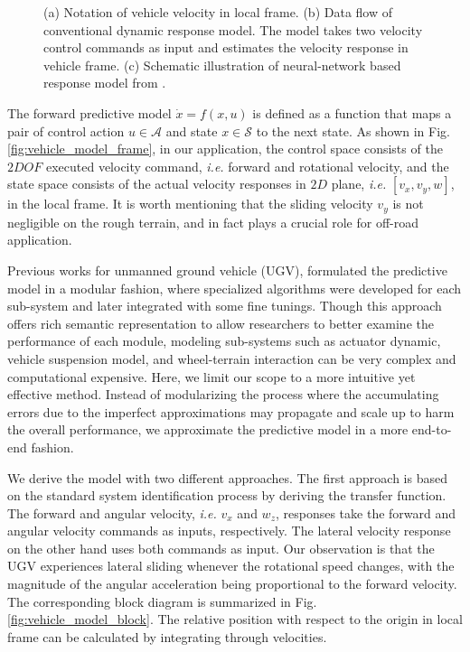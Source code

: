 \documentclass[../thesis.tex]{subfiles}
\begin{document}
\begin{figure}[t]
\begin{subfigure}[b]{0.8\linewidth}
		\subcaption{}
		\label{fig:vehicle_model_net}
	\end{subfigure}
	\caption{(a) Notation of vehicle velocity in local frame. (b) Data flow of conventional dynamic response model. The model takes two velocity control commands as input and estimates the velocity response in vehicle frame. (c) Schematic illustration of neural-network based response model from \cite{bode2007learning}.}
    \label{fig:vehicle_model}
\end{figure}


The forward predictive model $\dot{x}=f(x,u)$ is defined as a function that maps a pair of control action $u \in \mathcal{A}$ and state $x \in \mathcal{S}$ to the next state. As shown in Fig. \ref{fig:vehicle_model_frame}, in our application, the control space consists of the $2DOF$ executed velocity command, \textit{i.e.} forward and rotational velocity, and the state space consists of the actual velocity responses in $2D$ plane, \textit{i.e.} $[v_x, v_y, w]$, in the local frame. It is worth mentioning that the sliding velocity $v_y$ is not negligible on the rough terrain, and in fact plays a crucial role for off-road application.


Previous works \cite{kelly2007terrain,howard2006trajectory,howard2005terrain} for unmanned ground vehicle (UGV), formulated the predictive model in a modular fashion, where specialized algorithms were developed for each sub-system and later integrated with some fine tunings. Though this approach offers rich semantic representation to allow researchers to better examine the performance of each module, modeling sub-systems such as actuator dynamic, vehicle suspension model, and wheel-terrain interaction can be very complex and computational expensive. 
Here, we limit our scope to a more intuitive yet effective method. Instead of modularizing the process where the accumulating errors due to the imperfect approximations may propagate and scale up to harm the overall performance, we approximate the predictive model in a more end-to-end fashion. 

We derive the model with two different approaches. The first approach is based on the standard system identification process by deriving the transfer function. The forward and angular velocity, \textit{i.e.} $v_x$ and $w_z$, responses take the forward and angular velocity commands as inputs, respectively. The lateral velocity response on the other hand uses both commands as input. Our observation is that the UGV experiences lateral sliding whenever the rotational speed changes, with the magnitude of the angular acceleration being proportional to the forward velocity. The corresponding block diagram is summarized in Fig. \ref{fig:vehicle_model_block}. The relative position with respect to the origin in local frame can be calculated by integrating through velocities.
\end{document}
